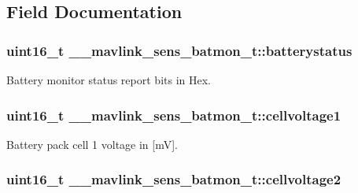 \subsection{Field Documentation}
\hypertarget{struct____mavlink__sens__batmon__t_a6c78470738a08381fa1671c5f7e0121d}{
\subsubsection[{batterystatus}]{\setlength{\rightskip}{0pt plus 5cm}uint16\+\_\+t \+\_\+\+\_\+mavlink\+\_\+sens\+\_\+batmon\+\_\+t\+::batterystatus}}\label{struct____mavlink__sens__batmon__t_a6c78470738a08381fa1671c5f7e0121d}


Battery monitor status report bits in Hex. 

\hypertarget{struct____mavlink__sens__batmon__t_abad383573c8ee5f7780bb7b4cee48238}{
\subsubsection[{cellvoltage1}]{\setlength{\rightskip}{0pt plus 5cm}uint16\+\_\+t \+\_\+\+\_\+mavlink\+\_\+sens\+\_\+batmon\+\_\+t\+::cellvoltage1}}\label{struct____mavlink__sens__batmon__t_abad383573c8ee5f7780bb7b4cee48238}


Battery pack cell 1 voltage in \mbox{[}m\+V\mbox{]}. 

\hypertarget{struct____mavlink__sens__batmon__t_a18041d9a8ed07319506f8d55f1491692}{
\subsubsection[{cellvoltage2}]{\setlength{\rightskip}{0pt plus 5cm}uint16\+\_\+t \+\_\+\+\_\+mavlink\+\_\+sens\+\_\+batmon\+\_\+t\+::cellvoltage2}}\label{struct____mavlink__sens__batmon__t_a18041d9a8ed07319506f8d55f1491692}


